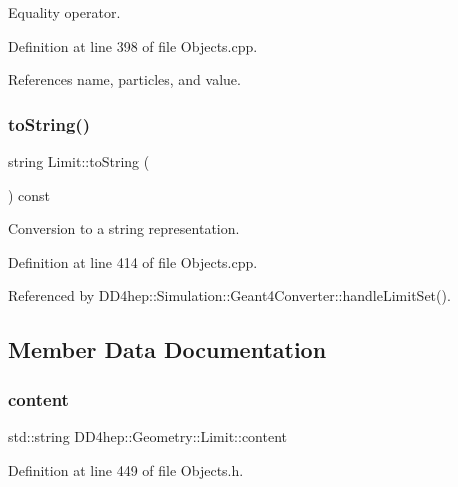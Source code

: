 Equality operator. 



Definition at line 398 of file Objects.\+cpp.



References name, particles, and value.

\hypertarget{class_d_d4hep_1_1_geometry_1_1_limit_a927e269dc3887a7408b00f8e2c61c590}{}\label{class_d_d4hep_1_1_geometry_1_1_limit_a927e269dc3887a7408b00f8e2c61c590} 
\subsubsection{\texorpdfstring{to\+String()}{toString()}}
{\footnotesize\ttfamily string Limit\+::to\+String (\begin{DoxyParamCaption}{ }\end{DoxyParamCaption}) const}



Conversion to a string representation. 



Definition at line 414 of file Objects.\+cpp.



Referenced by D\+D4hep\+::\+Simulation\+::\+Geant4\+Converter\+::handle\+Limit\+Set().



\subsection{Member Data Documentation}
\hypertarget{class_d_d4hep_1_1_geometry_1_1_limit_aafcf490f74d6001a5dde9d9c6061e694}{}\label{class_d_d4hep_1_1_geometry_1_1_limit_aafcf490f74d6001a5dde9d9c6061e694} 
\subsubsection{\texorpdfstring{content}{content}}
{\footnotesize\ttfamily std\+::string D\+D4hep\+::\+Geometry\+::\+Limit\+::content}



Definition at line 449 of file Objects.\+h.



